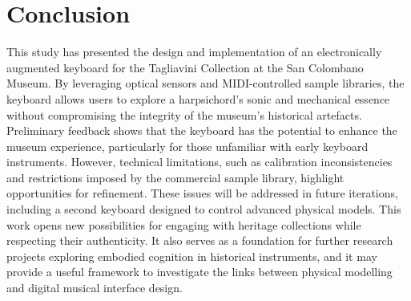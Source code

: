 \section{Conclusion}\label{conclusion}

This study has presented the design and implementation of an electronically augmented keyboard for the Tagliavini Collection at the San Colombano Museum. By leveraging optical sensors and MIDI-controlled sample libraries, the keyboard allows users to explore a harpsichord's sonic and mechanical essence without compromising the integrity of the museum's historical artefacts. Preliminary feedback shows that the keyboard has the potential to enhance the museum experience, particularly for those unfamiliar with early keyboard instruments. However, technical limitations, such as calibration inconsistencies and restrictions imposed by the commercial sample library, highlight opportunities for refinement. These issues will be addressed in future iterations, including a second keyboard designed to control advanced physical models. This work opens new possibilities for engaging with heritage collections while respecting their authenticity. It also serves as a foundation for further research projects exploring embodied cognition in historical instruments, and it may provide a useful framework to investigate the links between physical modelling and digital musical interface design.



